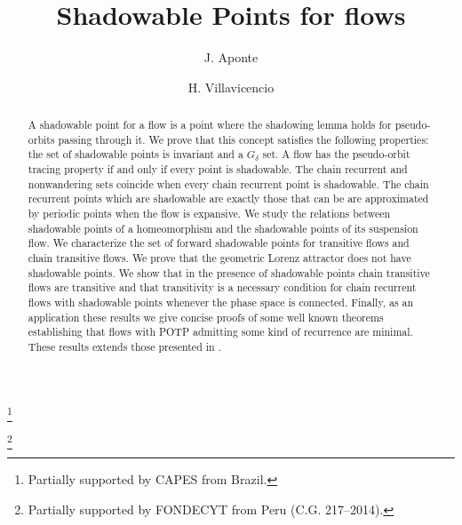 \documentclass{amsart}
\theoremstyle{definition}
\begin{document}
\title{Shadowable Points for flows}

\author{J. Aponte}
\address{Departamento de Matem\'{a}tica, Universidade Federal do Rio de Janeiro, Rio de Janeiro, Brazil.}
\thanks{Partially supported by CAPES from Brazil.}

\author{H. Villavicencio}
\address{Instituto de Matem\'{a}tica y Ciencias Afines, Lima, Per\'{u}.}
\thanks{Partially supported by FONDECYT from Peru (C.G. 217--2014).}





\begin{abstract}
A shadowable point for a flow is a point where the shadowing lemma holds for
pseudo-orbits passing through it. We prove that this concept satisfies the following properties: the set of shadowable points is invariant and a $G_{\delta}$ set. A flow has the pseudo-orbit tracing property if and only if every point is shadowable. The chain recurrent and nonwandering sets coincide when every chain recurrent point is shadowable. The chain recurrent points which are shadowable are exactly those that can be are approximated by periodic points when the flow is expansive. We study the relations between shadowable points of a homeomorphism and the shadowable points of its suspension flow. We characterize the set of forward shadowable points for transitive flows and chain transitive flows. We prove that the geometric Lorenz attractor does not have shadowable points. We show that in the presence of shadowable points chain transitive flows are transitive and that transitivity is a necessary condition for chain recurrent flows with shadowable points whenever the phase space is connected. Finally, as an application these results we give concise proofs of some well known theorems establishing that flows with POTP admitting some kind of recurrence are minimal. These results extends those presented in \cite{Morales16}.
\end{abstract}
\maketitle
\end{document}
